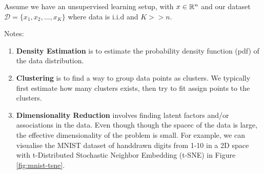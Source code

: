 Assume we have an unsupervised learning setup, with $x \in \mathbb{R}^n$ and our dataset $\mathcal{D} = \{ x_1, x_2, \ldots, x_K \}$ where data is i.i.d and  $K >> n$.

Notes:
\begin{enumerate}
    \item  \textbf{Density Estimation} is to estimate the probability density function (pdf) of the data distribution. 
    \item  \textbf{Clustering} is to find a way to group data points as clusters. We typically first estimate how many clusters exists, then try to fit assign points to the clusters.
    \item \textbf{Dimensionality Reduction} involves finding latent factors and/or associations in the data. Even though though the spacec of the data is large, the effective dimensionality of the problem is small. For example, we can visualise the MNIST dataset of handdrawn digits from 1-10 in a 2D space with t-Distributed Stochastic Neighbor Embedding (t-SNE) in Figure \ref{fig:mnist-tsne}.


\end{enumerate}
